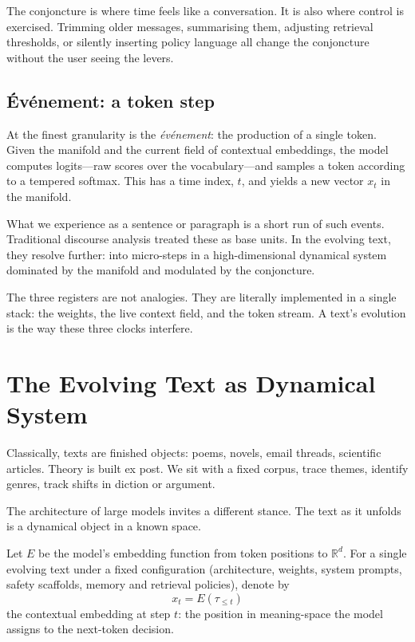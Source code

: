 \documentclass[12pt,a4paper]{article}
\begin{document}
The conjoncture is where time feels like a conversation. It is also where control is exercised. Trimming older messages, summarising them, adjusting retrieval thresholds, or silently inserting policy language all change the conjoncture without the user seeing the levers.

\subsection{Événement: a token step}

At the finest granularity is the \emph{événement}: the production of a single token. Given the manifold and the current field of contextual embeddings, the model computes logits---raw scores over the vocabulary---and samples a token according to a tempered softmax. This has a time index, $t$, and yields a new vector $x_t$ in the manifold.

What we experience as a sentence or paragraph is a short run of such events. Traditional discourse analysis treated these as base units. In the evolving text, they resolve further: into micro-steps in a high-dimensional dynamical system dominated by the manifold and modulated by the conjoncture.

The three registers are not analogies. They are literally implemented in a single stack: the weights, the live context field, and the token stream. A text's evolution is the way these three clocks interfere.

\section{The Evolving Text as Dynamical System}

Classically, texts are finished objects: poems, novels, email threads, scientific articles. Theory is built ex post. We sit with a fixed corpus, trace themes, identify genres, track shifts in diction or argument.

The architecture of large models invites a different stance. The text as it unfolds is a dynamical object in a known space.

Let $E$ be the model's embedding function from token positions to $\mathbb{R}^d$. For a single evolving text under a fixed configuration (architecture, weights, system prompts, safety scaffolds, memory and retrieval policies), denote by
\[
x_t = E(\tau_{\leq t})
\]
the contextual embedding at step $t$: the position in meaning-space the model assigns to the next-token decision.
\end{document}
